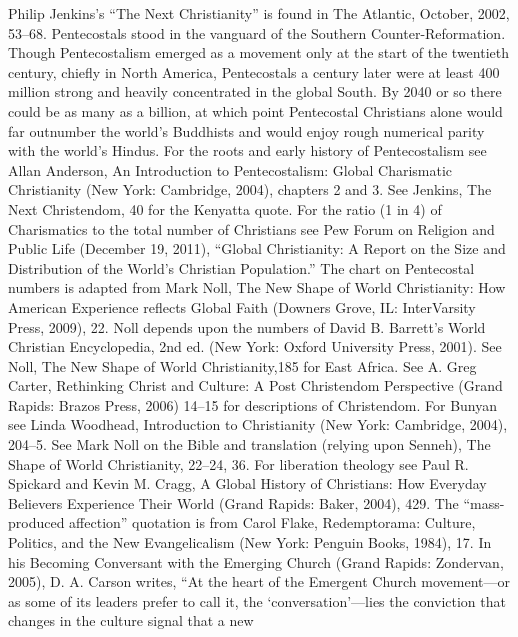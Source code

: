\begin{notelist}
\entry Philip Jenkins’s “The Next Christianity” is found in The Atlantic, October, 2002, 53–68.
\entry Pentecostals stood in the vanguard of the Southern Counter-Reformation. Though Pentecostalism
  emerged as a movement only at the start of the twentieth century, chiefly in North America,
  Pentecostals a century later were at least 400 million strong and heavily concentrated in the
  global South. By 2040 or so there could be as many as a billion, at which point Pentecostal
  Christians alone would far outnumber the world’s Buddhists and would enjoy rough numerical parity
  with the world’s Hindus.
\entry For the roots and early history of Pentecostalism see Allan Anderson, An Introduction to
  Pentecostalism: Global Charismatic Christianity (New York: Cambridge, 2004), chapters 2 and 3.
\entry See Jenkins, The Next Christendom, 40 for the Kenyatta quote.
\entry For the ratio (1 in 4) of Charismatics to the total number of Christians see Pew Forum on
  Religion
\entry and Public Life (December 19, 2011), “Global Christianity: A Report on the Size and
  Distribution of
\entry the World’s Christian Population.”
\entry The chart on Pentecostal numbers is adapted from Mark Noll, The New Shape of World
  Christianity: How American Experience reflects Global Faith (Downers Grove, IL: InterVarsity
  Press, 2009), 22. Noll depends upon the numbers of David B. Barrett’s World Christian
  Encyclopedia, 2nd ed. (New York: Oxford University Press, 2001).
\entry See Noll, The New Shape of World Christianity,185 for East Africa.
\entry See A. Greg Carter, Rethinking Christ and Culture: A Post Christendom Perspective (Grand
  Rapids: Brazos Press, 2006) 14–15 for descriptions of Christendom.
\entry For Bunyan see Linda Woodhead, Introduction to Christianity (New York: Cambridge, 2004),
  204–5.
\entry See Mark Noll on the Bible and translation (relying upon Senneh), The Shape of World
  Christianity, 22–24, 36.
\entry For liberation theology see Paul R. Spickard and Kevin M. Cragg, A Global History of
  Christians: How Everyday Believers Experience Their World (Grand Rapids: Baker, 2004), 429.
\entry The “mass-produced affection” quotation is from Carol Flake, Redemptorama: Culture, Politics,
  and the New Evangelicalism (New York: Penguin Books, 1984), 17.
\entry In his Becoming Conversant with the Emerging Church (Grand Rapids: Zondervan, 2005), D. A.
  Carson writes, “At the heart of the Emergent Church movement—or as some of its leaders prefer to
  call it, the ‘conversation’—lies the conviction that changes in the culture signal that a new

\end{notelist}
